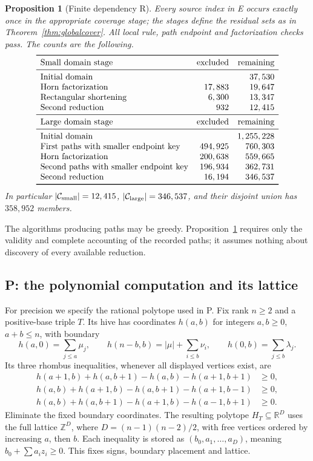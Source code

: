 \documentclass[11pt]{article}
\newtheorem{proposition}[theorem]{Proposition}
\begin{document}
\begin{proposition}[Finite dependency R]\label{comp:R}
Every source index in E occurs exactly once in the appropriate coverage
stage; the stages define the residual sets as in
Theorem~\ref{thm:globalcover}. All local rule, path endpoint and
factorization checks pass. The counts are the following.
\[
\begin{array}{lrr}
\toprule
\text{Small domain stage}&\text{excluded}&\text{remaining}\\
\midrule
\text{Initial domain}&&37,530\\
\text{Horn factorization}&17,883&19,647\\
\text{Rectangular shortening}&6,300&13,347\\
\text{Second reduction}&932&12,415\\
\midrule
\text{Large domain stage}&\text{excluded}&\text{remaining}\\
\midrule
\text{Initial domain}&&1,255,228\\
\text{First paths with smaller endpoint key}&494,925&760,303\\
\text{Horn factorization}&200,638&559,665\\
\text{Second paths with smaller endpoint key}&196,934&362,731\\
\text{Second reduction}&16,194&346,537\\
\bottomrule
\end{array}
\]
In particular $|\mathcal C_{\rm small}|=12,415$,
$|\mathcal C_{\rm large}|=346,537$, and their disjoint union has
$358,952$ members.
\end{proposition}
The algorithms producing paths may be greedy. Proposition~\ref{comp:R}
requires only the validity and complete accounting of the recorded paths;
it assumes nothing about discovery of every available reduction.

\subsection{P: the polynomial computation and its lattice}
For precision we specify the rational polytope used in P. Fix rank
$n\ge2$ and a positive-base triple $T$. Its hive has coordinates
$h(a,b)$ for integers $a,b\ge0$, $a+b\le n$, with boundary
\[
 h(a,0)=\sum_{j\le a}\mu_j,\qquad
 h(n-b,b)=|\mu|+\sum_{i\le b}\nu_i,\qquad
 h(0,b)=\sum_{j\le b}\lambda_j.
\]
Its three rhombus inequalities, whenever all displayed vertices exist,
are
\begin{align*}
 h(a+1,b)+h(a,b+1)-h(a,b)-h(a+1,b+1)&\ge0,\\
 h(a,b)+h(a+1,b)-h(a,b+1)-h(a+1,b-1)&\ge0,\\
 h(a,b)+h(a,b+1)-h(a+1,b)-h(a-1,b+1)&\ge0.
\end{align*}
Eliminate the fixed boundary coordinates. The resulting polytope
$H_T\subseteq\mathbb R^D$ uses the full lattice $\mathbb Z^D$, where
$D=(n-1)(n-2)/2$, with free vertices ordered by increasing $a$, then $b$.
Each inequality is stored as $(b_0,a_1,\ldots,a_D)$, meaning
$b_0+\sum a_i z_i\ge0$. This fixes signs, boundary placement and lattice.
\end{document}
